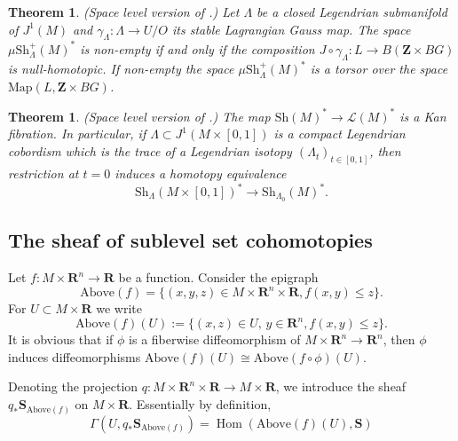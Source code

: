 \documentclass[12pt,a4paper]{article}
\numberwithin{equation}{section}
\newtheorem{thm}[equation]{Theorem}
\theoremstyle{definition}
\theoremstyle{remark}
\newcommand{\Z}{\mathbf{Z}}
\newcommand{\R}{\mathbf{R}}
\newcommand{\LL}{\mathcal{L}}
\newcommand{\Map}{\mathrm{Map}}
\newcommand{\Sh}{\mathrm{Sh}}
\renewcommand{\S}{\mathbf{S}}
\DeclareMathOperator{\Hom}{Hom}
\begin{document}
\begin{thm}\label{thm:spaceleveljin} (Space level version of \cite{Jin}.)
Let $\Lambda$ be a closed Legendrian submanifold of $J^1(M)$ and $\gamma_\Lambda:\Lambda\to U/O$ its stable Lagrangian Gauss map.
The space $\mu\Sh^+_\Lambda(M)^*$ is non-empty if and only if the composition $J\circ \gamma_\Lambda : L\to B(\Z\times BG)$ is null-homotopic.
If non-empty the space $\mu \Sh^+_\Lambda(M)^*$ is a torsor over the space $\Map(L,\Z\times BG)$.
\end{thm}

\begin{thm}\label{thm:spacelevelGKS} (Space level version of \cite{GKS}.)
The map $\Sh(M)^*\to \LL(M)^*$ is a Kan fibration. In particular, if $\Lambda\subset J^1(M\times[0,1])$ is
a compact Legendrian cobordism which is the trace of a Legendrian isotopy $(\Lambda_t)_{t\in[0,1]}$,
then restriction at $t=0$ induces a homotopy equivalence
\[\Sh_\Lambda(M\times [0,1])^*\to \Sh_{\Lambda_0}(M)^*.\]
\end{thm}


\subsection{The sheaf of sublevel set cohomotopies}\label{sec:GFtoSh}

Let $f:M\times \R^n\to \R$ be a function. Consider the epigraph
\[\mathrm{Above}(f)=\{(x,y,z)\in M\times \R^n\times \R, f(x,y)\leq z\}.\]
For $U \subset M \times \R$ we write
$$\mathrm{Above}(f)(U) := \{(x,z) \in U,\, y \in \R^n, f(x,y)\leq z\}.$$
It is obvious that if $\phi$ is a fiberwise diffeomorphism of $M \times \R^n \to \R^n$, then
$\phi$ induces diffeomorphisms
$\mathrm{Above}(f)(U) \cong \mathrm{Above}(f \circ \phi)(U)$.

Denoting the projection $q:M\times \R^n\times \R\to M\times \R$, we introduce the sheaf
$q_* \S_{\mathrm{Above}(f)}$ on $M \times \R$.  Essentially by definition,
$$\Gamma(U, q_* \S_{\mathrm{Above}(f)}) = \Hom(\mathrm{Above}(f)(U) ,\S)$$
\end{document}
